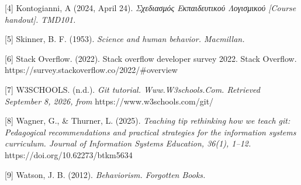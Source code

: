 \documentclass{article}
\begin{document}
[4] \foreignlanguage{english}{Kontogianni, A (2024, April 24).} \itshape{Σχεδιασμός Εκπαιδευτικού Λογισμικού}
[\foreignlanguage{english}{Course handout}]. \foreignlanguage{english}{TMD101}.

[5] \foreignlanguage{english}{Skinner, B. F. (1953). \itshape{Science and human behavior.} Macmillan.}

[6] \foreignlanguage{english}{Stack Overflow. (2022). Stack overflow developer survey 2022. Stack Overflow.}
\foreignlanguage{english}{https://survey.stackoverflow.co/2022/#overview}

[7] \foreignlanguage{english}{W3SCHOOLS. (n.d.). \itshape{Git tutorial. Www.W3schools.Com.} Retrieved September 8, 2026, from} \foreignlanguage{english}{https://www.w3schools.com/git/}

[8] \foreignlanguage{english}{Wagner, G., \& Thurner, L. (2025). \itshape{Teaching tip rethinking how we teach git: Pedagogical recommendations and practical strategies for the information systems curriculum.} Journal of Information Systems Education, 36(1), 1–12.} \foreignlanguage{english}{https://doi.org/10.62273/btkm5634}

[9] \foreignlanguage{english}{Watson, J. B. (2012). \itshape{Behaviorism}. Forgotten Books.}
\end{document}
